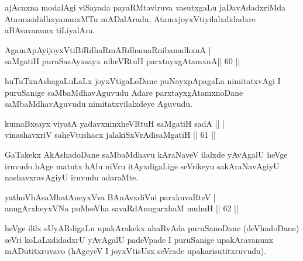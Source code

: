 \begin{artha}
ajAcnxna modalAgi viSayada payaRMtaviruva vasutxgaLu jaDavAdadxriMda AtamxsididhxyanunxMTu mADalAradu, AtamxjoyxVtiyilalxdidadxre aBAvavanunx tiLiyalAra.
\end{artha}


\begin{shl}
AgamApAyijoyxVtiBiRdhaRmARdhamaRnibanadhxnA | \\
saMgatiH puruSasAyxsayx niheVRtuH parxtayxgAtamxnA\hfill ||  60 ||  
\end{shl}

\begin{artha}
huTuTxnAshagaLuLaLx joyxVtigaLoDane puNayxpApagaLa nimitatxvAgi I puruSanige saMbaMdhavAguvudu Adare parxtayxgAtamxnoDane saMbaMdhavAguvudu nimitatxvilalxdeye Aguvudu.
\end{artha}


\begin{shl}
kumaBxsayx viyatA yadavxninxheVRtuH saMgatiH sadA ||  | \\
vinashavxriV saheVtushacx jalakiSxVrAdisaMgatiH \hfill||  61 ||  
\end{shl}

\begin{artha}
GaTakekx AkAshadoDane saMbaMdhavu kAraNaveV ilalxde yAvAgalU heVge iruvudo hAge matutx hAlu niVru itAyxdigaLige seVrikeyu sakAraNavAgiyU nashavxravAgiyU iruvudu adaraMte.
\end{artha}


\begin{shl}
\footnotemark[1]{}yathoVhAsaMhatAneyxVva BAnAvxdiVni parxkuvaRteV | \\
anugArxheyxVNa puMseVha savaRdA\s nugarxhaM muhuH \hfill ||  62 ||  
\end{shl}

\begin{artha}
heVge ililx sUyARdigaLu upakArakekx ahaRvAda puruSanoDane (deVhadoDane) seVri koLaLxdidadxrU yAvAgalU padeVpade I puruSanige upakAravanunx mADutitxruvavo (hAgeyeV I joyxVtisUsx seVrade upakarisutitxruvudu).
\end{artha}

